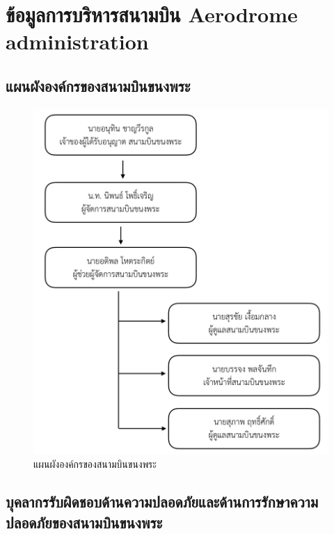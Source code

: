
\chapter{ข้อมูลการบริหารสนามบิน
Aerodrome administration}

\section{แผนผังองค์กรของสนามบินขนงพระ}

\begin{figure}[ht]
\begin{center}
\includegraphics[scale=0.5]{images/KNP_Org_Chart.png}
\caption{แผนผังองค์กรของสนามบินขนงพระ}
\label{แผนผังองค์กรของสนามบินขนงพระ}
\end{center}
\end{figure}

\newpage

\section{บุคลากรรับผิดชอบด้านความปลอดภัยและด้านการรักษาความปลอดภัยของสนามบินขนงพระ}

